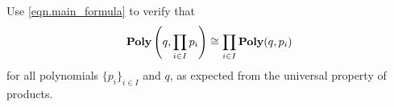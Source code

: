 \documentclass[Book-Poly]{subfiles}
\begin{document}
\begin{exercise}%
	
	
	Use \eqref{eqn.main_formula}
	to verify that
	\[
	    \mathbf{Poly}\left(q, \prod_{i \in I} p_i\right) \cong \prod_{i \in I} \mathbf{Poly}(q, p_i)
	\]
	for all polynomials $\{p_i\}_{i \in I}$ and $q$, as expected from the universal property of products.
\qedhere
\begin{solution}
    
    

\end{solution}
\end{exercise}
\end{document}
